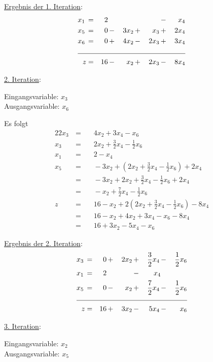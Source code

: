 \documentclass[10pt,a4paper,oneside,ngerman,numbers=noenddot]{scrartcl}
\begin{document}
		\underline{Ergebnis der 1. Iteration}:
		\begin{alignat*}{5}
			x_{1} \,&=&\, 2 \,&&  && &-&\, x_{4} \\
			x_{5} \,&=&\, 0 \,&-&\, 3x_{2} \,&+&\, x_{3} \,&+&\, 2x_{4} \\
			x_{6} \,&=&\, 0 \,&+&\, 4x_{2} \,&-&\, 2x_{3} \,&+&\, 3x_{4} \\ \cline{1 - 9}
			z &=& 16 \,&-&\, x_{2} \,&+&\, 2x_{3} \,&-&\, 8x_{4}
		\end{alignat*}
		
		\underline{2. Iteration}:
		
		Eingangsvariable: $x_{3}$ \\
		Ausgangsvariable: $x_{6}$
		
		Es folgt
		\begin{alignat*}{2}
			2x_{3} \,&=&&\, 4x_{2} + 3x_{4} - x_{6} \\
			x_{3} \,&=&&\, 2x_{2} + \frac{3}{2}x_{4} - \frac{1}{2}x_{6} \\
			x_{1} \,&=&&\, 2 - x_{4}\\
			x_{5} \,&=&&\, - 3x_{2} + \left(2x_{2} + \frac{3}{2}x_{4} - \frac{1}{2}x_{6}\right) + 2x_{4} \\
			&=&&\, - 3x_{2} + 2x_{2} + \frac{3}{2}x_{4} - \frac{1}{2}x_{6} + 2x_{4} \\
			&=&&\, - x_{2} + \frac{7}{2}x_{4} - \frac{1}{2}x_{6} \\
			z \,&=&&\, 16 - x_{2} + 2\left(2x_{2} + \frac{3}{2}x_{4} - \frac{1}{2}x_{6}\right) - 8x_{4} \\
			&=&&\, 16 - x_{2} + 4x_{2} + 3x_{4} - x_{6} - 8x_{4} \\
			&=&&\, 16 + 3x_{2} - 5x_{4} - x_{6} 
		\end{alignat*}
		
		\underline{Ergebnis der 2. Iteration}:
		\begin{alignat*}{5}
			x_{3} \,&=&\, 0 \,&+&\, 2x_{2} \,&+&\, \frac{3}{2}x_{4} \,&-&\, \frac{1}{2}x_{6} \\
			x_{1} \,&=&\, 2 \,&& &-&\, x_{4} && \\
			x_{5} \,&=&\, 0 \,&-&\, x_{2} \,&+&\, \frac{7}{2}x_{4} \,&-&\, \frac{1}{2}x_{6} \\ \cline{1 - 9}
			z &=& 16 \,&+&\, 3x_{2} \,&-&\, 5x_{4} \,&-&\, x_{6}
		\end{alignat*}
		
		\underline{3. Iteration}:
		
		Eingangsvariable: $x_{2}$ \\
		Ausgangsvariable: $x_{5}$
		
\end{document}
